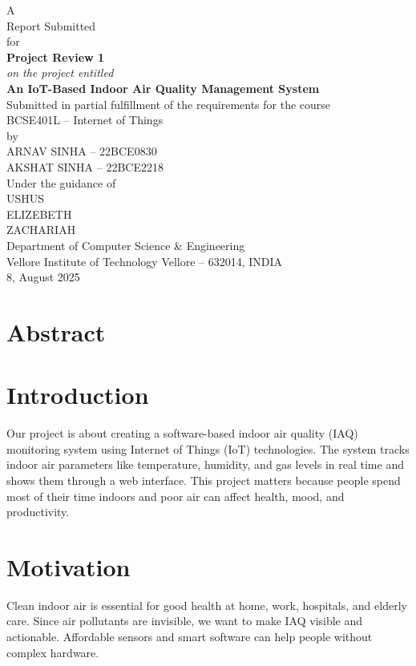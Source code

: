 \documentclass[12pt]{report}
\newcommand{\course}{BCSE401L -- Internet of Things}
\newcommand{\projecttitle}{An IoT-Based Indoor Air Quality Management System}
\newcommand{\institute}{Vellore Institute of Technology Vellore -- 632014, INDIA}
\newcommand{\dept}{Department of Computer Science \& Engineering}
\newcommand{\authors}{ARNAV SINHA -- 22BCE0830\\AKSHAT SINHA -- 22BCE2218}
\newcommand{\guides}{USHUS\\ELIZEBETH\\ZACHARIAH}
\newcommand{\reportdate}{8, August 2025}
\begin{document}
\begin{titlepage}
\centering
\vspace*{1cm}
{\large A\\[6pt] Report Submitted\\[6pt] for}\\[12pt]
{\bfseries\Large Project Review 1}\\[10pt]
{\itshape on the project entitled}\\[4pt]
{\bfseries\LARGE \projecttitle}\\[8pt]
{\large Submitted in partial fulfillment of the requirements for the course}\\[4pt]
{\Large \course}\\[12pt]
{by}\\[6pt]
{\large \authors}\\[12pt]
{Under the guidance of}\\[6pt]
{\large \guides}\\[12pt]
\vfill
{}
{\dept}\\[4pt]
{\institute}\\[6pt]
{\reportdate}
\end{titlepage}

\tableofcontents
\cleardoublepage
{}

\section*{Abstract}

\section{Introduction}
Our project is about creating a software-based indoor air quality (IAQ) monitoring system using Internet of Things (IoT) technologies. The system tracks indoor air parameters like temperature, humidity, and gas levels in real time and shows them through a web interface. This project matters because people spend most of their time indoors and poor air can affect health, mood, and productivity.

\section{Motivation}
Clean indoor air is essential for good health at home, work, hospitals, and elderly care. Since air pollutants are invisible, we want to make IAQ visible and actionable. Affordable sensors and smart software can help people without complex hardware.
\end{document}
